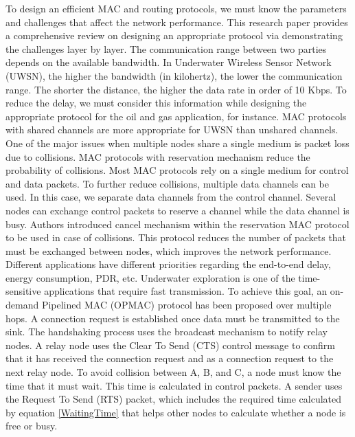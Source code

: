 \documentclass{article}
\begin{document}
{To design an efficient MAC and routing protocols, we must know the parameters and challenges that affect the network performance. This research paper provides a comprehensive review on designing an appropriate protocol via demonstrating the challenges layer by layer. The communication range between two parties depends on the available bandwidth. In Underwater Wireless Sensor Network (UWSN), the higher the bandwidth (in kilohertz), the lower the communication range. The shorter the distance, the higher the data rate in order of 10 Kbps. To reduce the delay, we must consider this information while designing the appropriate protocol for the oil and gas application, for instance. MAC protocols with shared channels are more appropriate for UWSN than unshared channels.\cite{Sharif-Yazd2017}\\ 

One of the major issues when multiple nodes share a single medium is packet loss due to collisions. MAC protocols with reservation mechanism reduce the probability of collisions. Most MAC protocols rely on a single medium for control and data packets. To further reduce collisions, multiple data channels can be used. In this case, we separate data channels from the control channel. Several nodes can exchange control packets to reserve a channel while the data channel is busy. Authors introduced cancel mechanism within the reservation MAC protocol to be used in case of collisions. This protocol reduces the number of packets that must be exchanged between nodes, which improves the network performance.\cite{Yu2014}\\

Different applications have different priorities regarding the end-to-end delay, energy consumption, PDR, etc. Underwater exploration is one of the time-sensitive applications that require fast transmission. To achieve this goal, an on-demand Pipelined MAC (OPMAC) protocol has been proposed over multiple hops. A connection request is established once data must be transmitted to the sink. The handshaking process uses the broadcast mechanism to notify relay nodes. A relay node uses the Clear To Send (CTS) control message to confirm that it has received the connection request and as a connection request to the next relay node. To avoid collision between A, B, and C, a node must know the time that it must wait. This time is calculated in control packets. A sender uses the Request To Send (RTS) packet, which includes the required time calculated by equation \ref{WaitingTime} that helps other nodes to calculate whether a node is free or busy.

}
\end{document}
